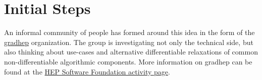 \documentclass{article}
\begin{document}





\section{Initial Steps}

An informal community of people has formed around this idea in the form of the \href{https://github.com/gradhep}{gradhep} organization. The group is investigating not only the technical side, but also thinking about use-cases and alternative differentiable relaxations of common non-differentiable algorithmic components.  More information on gradhep can be found at the \href{https://hepsoftwarefoundation.org/activities/differentiablecomputing.html}{HEP Software Foundation activity page}.
\end{document}
